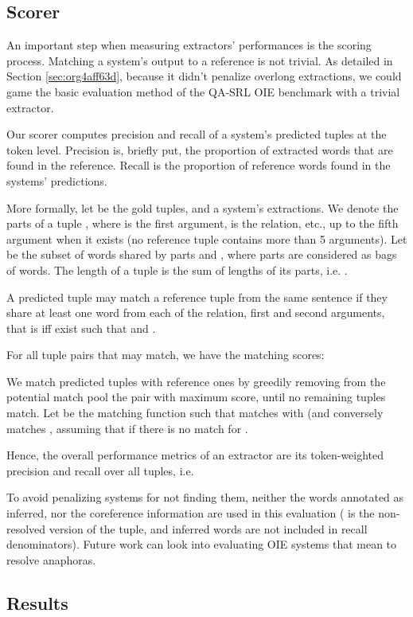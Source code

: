 \pdfoutput=1 \documentclass[11pt, a4paper]{article}
\begin{document}
\subsection{Scorer}
\label{sec:org4b13ea5}


An important step when measuring extractors' performances is the scoring
process. Matching a system's output to a reference is not trivial.  As detailed
in Section \ref{sec:org4aff63d}, because it didn't penalize overlong
extractions, we could game the basic evaluation method of the QA-SRL OIE
benchmark with a trivial extractor.


Our scorer computes precision and recall of a system's predicted tuples at the
token level. Precision is, briefly put, the proportion of extracted words that
are found in the reference. Recall is the proportion of reference words found
in the systems' predictions.

More formally, let  be the gold tuples, and
 a system's extractions. We denote
the parts of a tuple , where  is the first argument,  is the
relation, etc., up to  the fifth argument when it exists (no reference
tuple contains more than 5 arguments). Let  be the subset
of words shared by parts  and , where parts are considered as
bags of words. The length of a tuple is the sum of lengths of its parts,
i.e. .

A predicted tuple  may match a reference tuple  from the same
sentence if they share at least one word from each of the relation, first and
second arguments, that is iff  exist such
that 
and .

For all tuple pairs that may match, we have the matching scores: 


We match predicted tuples with reference ones by greedily removing from the potential match pool the pair with maximum  score, until no remaining tuples match. Let  be the matching function such that  matches with  (and conversely  matches , assuming that  if there is no match for .

Hence, the overall performance metrics of an extractor are its token-weighted precision and recall over all tuples, i.e. 


To avoid penalizing systems for not finding them, neither the words annotated
as inferred, nor the coreference information are used in this evaluation (
is the non-resolved version of the tuple, and inferred words are not included
in recall denominators). Future work can look into evaluating OIE systems that
mean to resolve anaphoras.

\subsection{Results}
\label{sec:orgf4eff85}
\end{document}
